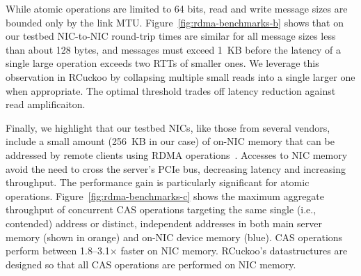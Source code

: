 
While atomic operations are limited to 64 bits, read and write message
sizes are bounded only by the link MTU.
Figure~\ref{fig:rdma-benchmarks-b} shows that on our testbed
NIC-to-NIC round-trip times are similar for all message sizes
less than about 128 bytes, and
messages must exceed 1~KB before the latency of a single large
operation exceeds two RTTs of smaller ones.  We leverage this
observation in RCuckoo by collapsing multiple small reads into a
single larger one when appropriate.  The optimal threshold trades off
latency reduction against read amplificaiton.


Finally, we highlight that our testbed NICs, like those from several
vendors, include a small amount (256~KB in our case) of on-NIC memory
that can be addressed by remote clients using RDMA
operations~\cite{device-memory}.  Accesses to NIC memory avoid the
need to cross the server's PCIe bus, decreasing latency and increasing
throughput.  The performance gain is particularly significant for
atomic operations.  Figure~\ref{fig:rdma-benchmarks-c} shows the
maximum aggregate throughput of concurrent CAS operations targeting
the same single (i.e., contended) address or distinct, independent
addresses in both main server memory (shown in orange) and on-NIC
device memory (blue).  CAS operations perform between 1.8--3.1$\times$
faster on NIC memory.  RCuckoo's datastructures are designed so that
all CAS operations are performed on NIC memory.


